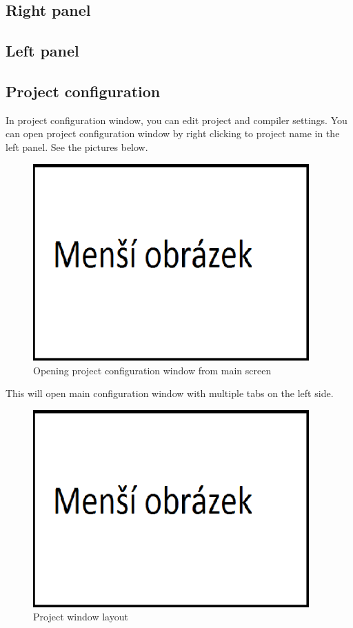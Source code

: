 \subsection{Right panel}

\subsection{Left panel}

\subsection{Project configuration}
    In project configuration window, you can edit project and compiler settings. You can open project configuration window by right clicking to project name in the left panel. See the pictures below.
    \begin{figure}
        \centering{}
        \includegraphics [width=300pt]{img/mensi_obrazek.png}
        \caption{Opening project configuration window from main screen}
    \end{figure}

    This will open main configuration window with multiple tabs on the left side.
    \begin{figure}
        \centering{}
        \includegraphics [width=300pt]{img/mensi_obrazek.png}
        \caption{Project window layout}
    \end{figure}

